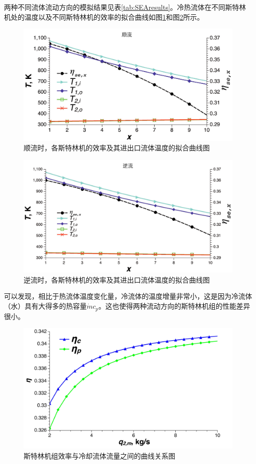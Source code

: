 两种不同流体流动方向的模拟结果见表\ref{tab:SEAresults}。冷热流体在不同斯特林机处的温度以及不同斯特林机的效率的拟合曲线如图\ref{fig:Parallelflow}和图\ref{fig:Counterflow}所示。

\begin{figure}[ht!]
\centering
	\includegraphics[width = 0.8\columnwidth]{fig/Parallelflow.pdf}
	\caption{顺流时，各斯特林机的效率及其进出口流体温度的拟合曲线图}
	\label{fig:Parallelflow}
\end{figure}

\begin{figure}[ht!]
\centering
	\includegraphics[width = 0.8\columnwidth]{fig/Counterflow.pdf}
	\caption{逆流时，各斯特林机的效率及其进出口流体温度的拟合曲线图}
	\label{fig:Counterflow}
\end{figure}

可以发现，相比于热流体温度变化量，冷流体的温度增量非常小，这是因为冷流体（水）具有大得多的热容量$\dot{m}c_p$。这也使得两种流动方向的斯特林机组的性能差异很小。

\begin{figure}[htbp]
\centering
	\includegraphics[width = 0.8\columnwidth, angle = 0]{fig/SEAflowtypes}
	\caption{斯特林机组效率与冷却流体流量之间的曲线关系图}
	\label{fig:SEAflowtypes}
\end{figure}

